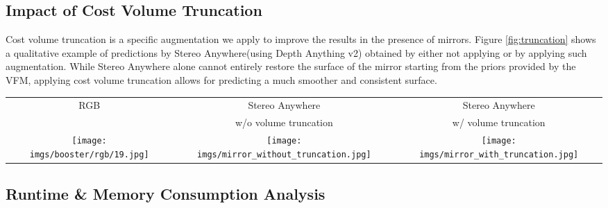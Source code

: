 \documentclass[10pt,twocolumn,letterpaper]{article}
\newcommand{\method}[0]{Stereo Anywhere\xspace}
\begin{document}
\phantom{Invisible Text}
\vspace{-\baselineskip}

\subsection{Impact of Cost Volume Truncation}

\label{subsec:vol_trunc_qual}

Cost volume truncation is a specific augmentation we apply to improve the results in the presence of mirrors. Figure \ref{fig:truncation} shows a qualitative example of predictions by \method (using Depth Anything v2) obtained by either not applying or by applying such augmentation.
While \method alone cannot entirely restore the surface of the mirror starting from the priors provided by the VFM, applying cost volume truncation allows for predicting a much smoother and consistent surface.

\begin{figure*}[h]
    \centering
    \renewcommand{\tabcolsep}{1pt}
    \begin{tabular}{ccc}
    \multirow{2}{*}{\small RGB} & \small \method & \small \method \\
    & \small w/o volume truncation & \small w/ volume truncation \\
    \texttt{[image: imgs/booster/rgb/19.jpg]} &
    \texttt{[image: imgs/mirror\_without\_truncation.jpg]} &
    \texttt{[image: imgs/mirror\_with\_truncation.jpg]} \\
    \end{tabular}

    \caption{\textbf{Qualitative Results -- Volume Truncation.} Predictions by \method{}.}
    \label{fig:truncation}\vspace{-0.3cm}

\end{figure*}


\phantom{Invisible Text}
\vspace{-\baselineskip}

\subsection{Runtime \& Memory Consumption Analysis}
\end{document}
